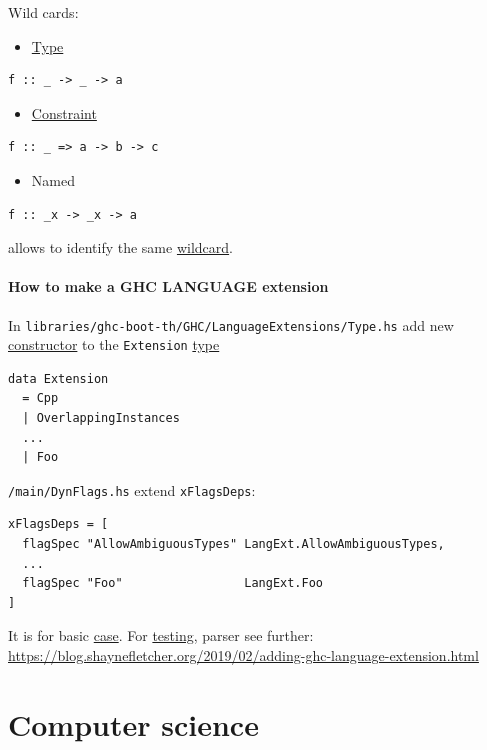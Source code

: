\documentclass[a4paper,14pt,oneside]{book}
\begin{document}
Wild cards:
\begin{itemize}
\item \hyperref[org99e5c3b]{Type}
\end{itemize}
\begin{verbatim}
f :: _ -> _ -> a
\end{verbatim}

\begin{itemize}
\item \hyperref[org4f4d80f]{Constraint}
\end{itemize}
\begin{verbatim}
f :: _ => a -> b -> c
\end{verbatim}

\begin{itemize}
\item Named
\end{itemize}
\begin{verbatim}
f :: _x -> _x -> a
\end{verbatim}
allows to identify the same \hyperref[org1ee4bf0]{wildcard}.

\subsubsection{How to make a GHC LANGUAGE extension}
\label{sec:org24f59d8}

In \texttt{libraries/ghc-boot-th/GHC/LanguageExtensions/Type.hs} add new \hyperref[orgd87c96f]{constructor} to the \texttt{Extension} \hyperref[org99e5c3b]{type}
\begin{verbatim}
data Extension
  = Cpp
  | OverlappingInstances
  ...
  | Foo
\end{verbatim}

\texttt{/main/DynFlags.hs} extend \texttt{xFlagsDeps}:
\begin{verbatim}
xFlagsDeps = [
  flagSpec "AllowAmbiguousTypes" LangExt.AllowAmbiguousTypes,
  ...
  flagSpec "Foo"                 LangExt.Foo
]
\end{verbatim}
It is for basic \hyperref[orgda48755]{case}. For \hyperref[orgea1c20b]{testing}, parser see further: \url{https://blog.shaynefletcher.org/2019/02/adding-ghc-language-extension.html}

\chapter{Computer science}
\label{sec:orgbfff369}
\end{document}
